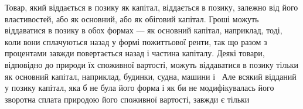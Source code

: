 Товар, який віддається в позику як капітал, віддається в позику,
залежно від його властивостей, або як основний, або як
обіговий капітал. Гроші можуть віддаватися в позику в обох
формах — як основний капітал, наприклад, тоді, коли вони сплачуються
назад у формі пожиттьової ренти, так що разом з процентами
завжди повертається назад і частина капіталу. Деякі
товари, відповідно до природи їх споживної вартості, можуть
віддаватися в позику тільки як основний капітал, наприклад,
будинки, судна, машини і~ Але всякий відданий у позику капітал,
яка б не була його форма і як би не модифікувалась його зворотна
сплата природою його споживної вартості, завжди є тільки
\parbreak{}  %
